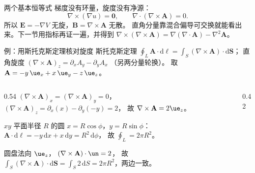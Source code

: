 \documentclass[fontset=windows, chinese, 10pt, xcolor=dvipsnames]{beamer}
\begin{document}
\begin{frame}{两个基本恒等式}
  梯度没有环量，旋度没有净源：
  \begin{equation*}
    \nabla\times(\nabla u)=\mathbf{0},
    \qquad
    \nabla\cdot(\nabla\times\mathbf{A})=0.
  \end{equation*}
  所以 $\mathbf{E}=-\nabla V$ 无旋，$\mathbf{B}=\nabla\times\mathbf{A}$ 无散。
  直角分量靠混合偏导可交换就能看出来。下一节用指标再证一遍，并得到
  $\nabla\times(\nabla\times\mathbf{A})=\nabla(\nabla\cdot\mathbf{A})-\nabla^2\mathbf{A}$。
\end{frame}

\begin{frame}{例：用斯托克斯定理核对旋度}
  \footnotesize
  斯托克斯定理
  $\oint_L\mathbf{A}\cdot\mathrm{d}\boldsymbol{\ell}
  =\int_S(\nabla\times\mathbf{A})\cdot\mathrm{d}\mathbf{S}$；
  直角旋度
  $(\nabla\times\mathbf{A})_z=\partial_x A_y-\partial_y A_x$
  （另两分量轮换）。
  取 $\mathbf{A}=-y\,\ue_x+x\,\ue_y-z\,\ue_z$。
  \begin{columns}[T]
    \begin{column}{0.54\textwidth}
      $(\nabla\times\mathbf{A})_x
      =(\nabla\times\mathbf{A})_y=0$，
      $(\nabla\times\mathbf{A})_z
      =\partial_x(x)-\partial_y(-y)=2$，
      故 $\nabla\times\mathbf{A}=2\ue_z$。

      $xy$ 平面半径 $R$ 的圆
      $x=R\cos\phi$，$y=R\sin\phi$：
      $\mathbf{A}\cdot\mathrm{d}\boldsymbol{\ell}
      =-y\,\mathrm{d}x+x\,\mathrm{d}y=R^2\,\mathrm{d}\phi$，
      故 $\oint_L=2\pi R^2$。

      圆盘法向 $\ue_z$，
      $(\nabla\times\mathbf{A})\cdot\un=2$，
      故
      $\int_S(\nabla\times\mathbf{A})\cdot\mathrm{d}\mathbf{S}
      =\int_S 2\,\mathrm{d}S=2\pi R^2$，两边一致。
    \end{column}
    \begin{column}{0.42\textwidth}
      \centering
      \vspace{0.6em}
      \scalebox{0.78}{}
    \end{column}
  \end{columns}
\end{frame}
\end{document}
